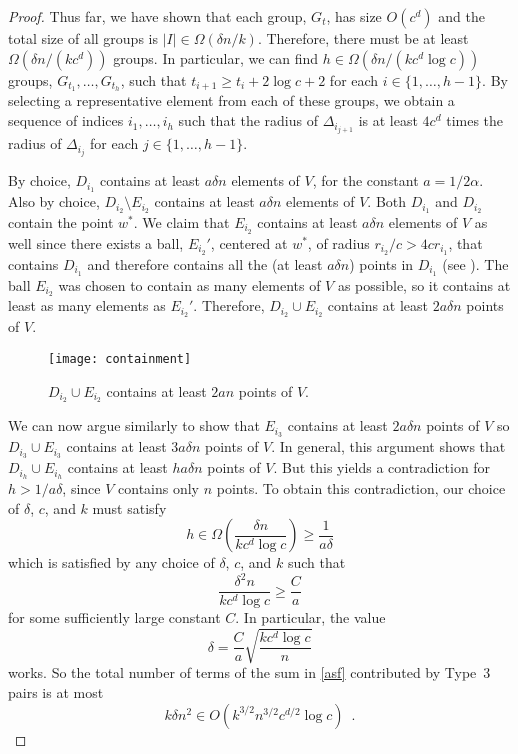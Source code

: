 \documentclass{patmorin}
\begin{document}
\begin{proof}
  Thus far, we have shown that each group, $G_t$, has size $O(c^d)$
  and the total size of all groups is $|I|\in\Omega(\delta n/k)$.
  Therefore, there must be at least $\Omega(\delta n/(kc^d))$ groups.
  In particular, we can find $h\in\Omega(\delta n/(kc^d\log c))$ groups,
  $G_{t_1},\ldots,G_{t_h}$, such that $t_{i+1} \ge t_{i}+2\log c+2$ for
  each $i\in\{1,\ldots,h-1\}$.  By selecting a representative element from
  each of these groups, we obtain a sequence of indices $i_1,\ldots,i_h$
  such that the radius of $\Delta_{i_{j+1}}$ is at least $4c^d$ times
  the radius of $\Delta_{i_j}$ for each $j\in\{1,\ldots,h-1\}$.

  By choice, $D_{i_1}$ contains at least $ a \delta n$ elements of
  $V$, for the constant $a=1/2\alpha$.  Also by choice, $D_{i_2}\setminus
  E_{i_2}$ contains at least $ a \delta n$ elements of $V$.
  Both $D_{i_1}$ and $D_{i_2}$ contain the point $w^*$.  We claim
  that $E_{i_2}$ contains at least $ a \delta n$ elements of $V$
  as well since there exists a ball, $E_{i_2}'$, centered at $w^*$,
  of radius $r_{i_2}/c > 4cr_{i_1}$, that contains $D_{i_1}$ and
  therefore contains all the (at least $ a\delta n$) points in $D_{i_1}$
  (see ).  The ball $E_{i_2}$ was chosen to contain
  as many elements of $V$ as possible, so it contains at least as many
  elements as $E_{i_2}'$.  Therefore, $D_{i_2}\cup E_{i_2}$ contains at
  least $2 a  \delta n$ points of $V$.

  \begin{figure}
     \begin{center}
       \texttt{[image: containment]}
     \end{center}
     \caption{$D_{i_2}\cup E_{i_2}$ contains at least $2 a  n$ 
              points of $V$.}
   \end{figure}

  We can now argue similarly to show that $E_{i_3}$ contains at
  least $2 a \delta n$ points of $V$ so $D_{i_3}\cup E_{i_3}$
  contains at least $3 a \delta n$ points of $V$.  In general,
  this argument shows that $D_{i_h}\cup E_{i_h}$ contains at least
  $h a \delta n$ points of $V$.  But this yields a contradiction for
  $h> 1/ a \delta$, since $V$ contains only $n$ points.  To obtain
  this contradiction, our choice of $\delta$, $c$, and $k$ must satisfy
  \[
       h\in\Omega\left(\frac{\delta n}{kc^d\log c}\right) \ge
          \frac{1}{ a  \delta}
  \]
  which is satisfied by any choice of $\delta$, $c$, and $k$ such that
  \[
       \frac{\delta^2 n}{kc^d\log c} \ge \frac{C}{a}
  \]
  for some sufficiently large constant $C$.  In particular, the value
  \[
       \delta = \frac{C}{a}\sqrt{\frac{kc^d\log c}{n}}
  \]
  works.  So the total number of terms of the sum in \eqref{asf}
  contributed by Type~3 pairs is at most
  \[
    k\delta n^2 \in O(k^{3/2}n^{3/2}c^{d/2}\log c) \enspace .
  \]


\end{proof}
\end{document}
